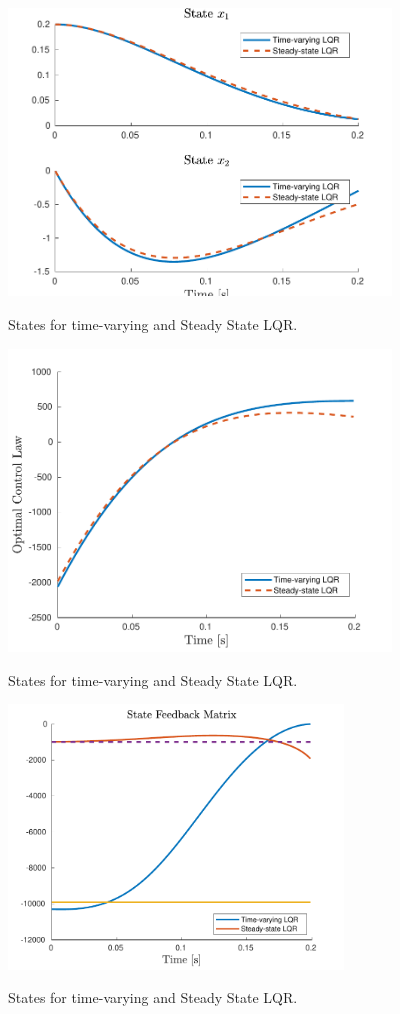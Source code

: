 \documentclass{article}
\begin{document}
\begin{figure}[H] 
\centering
\includegraphics [width=4in]{states2} \label{states1}
\caption{States for time-varying and Steady State LQR.}
\end{figure}

\begin{figure}[H] 
\centering
\includegraphics [width=4in]{control2} \label{control1}
\caption{States for time-varying and Steady State LQR.}
\end{figure}

\begin{figure}[H] 
\centering
\includegraphics [width=3.5in]{gain2} \label{gain1}
\caption{States for time-varying and Steady State LQR.}
\end{figure}
\end{document}
